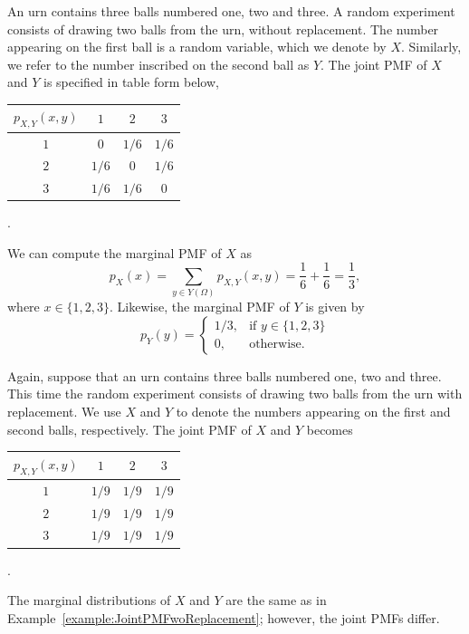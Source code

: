 \begin{example} \label{example:JointPMFwoReplacement}
An urn contains three balls numbered one, two and three.
A random experiment consists of drawing two balls from the urn, without replacement.
The number appearing on the first ball is a random variable, which we denote by $X$.
Similarly, we refer to the number inscribed on the second ball as $Y$.
The joint PMF of $X$ and $Y$ is specified in table form below,
\begin{center}
\begin{tabular}{|c|c|c|c|}
\hline
$p_{X,Y} (x,y)$ & $1$ & $2$ & $3$ \\
\hline
$1$ & $0$ & $1/6$ & $1/6$ \\
\hline
$2$ & $1/6$ & $0$ & $1/6$ \\
\hline
$3$ & $1/6$ & $1/6$ & $0$ \\
\hline
\end{tabular} .
\end{center}
We can compute the marginal PMF of $X$ as
\begin{equation*}
p_X (x) = \sum_{y \in Y(\Omega)} p_{X,Y} (x,y)
= \frac{1}{6} + \frac{1}{6} = \frac{1}{3},
\end{equation*}
where $x \in \{1, 2, 3 \}$.
Likewise, the marginal PMF of $Y$ is given by
\begin{equation*}
p_Y (y) = \left\{ \begin{array}{ll}
1/3, & \text{if }y \in \{ 1, 2, 3 \} \\
0, & \text{otherwise} .
\end{array} \right.
\end{equation*}
\end{example}

\begin{example} \label{example:JointPMFwithReplacement}
Again, suppose that an urn contains three balls numbered one, two and three.
This time the random experiment consists of drawing two balls from the urn with replacement.
We use $X$ and $Y$ to denote the numbers appearing on the first and second balls, respectively.
The joint PMF of $X$ and $Y$ becomes
\begin{center}
\begin{tabular}{|c|c|c|c|}
\hline
$p_{X,Y} (x,y)$ & $1$ & $2$ & $3$ \\
\hline
$1$ & $1/9$ & $1/9$ & $1/9$ \\
\hline
$2$ & $1/9$ & $1/9$ & $1/9$ \\
\hline
$3$ & $1/9$ & $1/9$ & $1/9$ \\
\hline
\end{tabular} .
\end{center}
The marginal distributions of $X$ and $Y$ are the same as in Example~\ref{example:JointPMFwoReplacement};
however, the joint PMFs differ.
\end{example}


